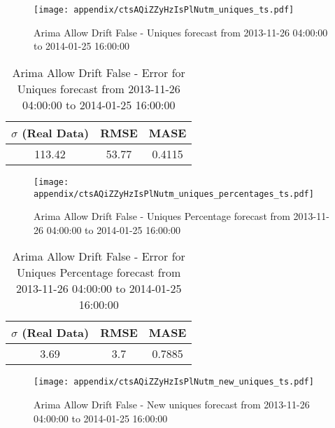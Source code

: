 \begin{figure}[H] \begin{center} \leavevmode
\texttt{[image: appendix/ctsAQiZZyHzIsPlNutm\_uniques\_ts.pdf]} \caption[]{
Arima Allow Drift False - Uniques forecast from 2013-11-26 04:00:00 to 2014-01-25 16:00:00} \label{fig:appendix/ctsAQiZZyHzIsPlNutm_uniques_ts.pdf} \end{center}
\end{figure}

\begin{table}[H]
\centering
\footnotesize
\begin{tabular}{ccc}
$\sigma$ (Real Data) & RMSE & MASE   \\ \hline
113.42 & 53.77 & 0.4115 \\
\end{tabular}

\vspace{0.5cm}

\caption[]{
Arima Allow Drift False - Error for Uniques forecast from 2013-11-26 04:00:00 to 2014-01-25 16:00:00}
\end{table}

\begin{figure}[H] \begin{center} \leavevmode
\texttt{[image: appendix/ctsAQiZZyHzIsPlNutm\_uniques\_percentages\_ts.pdf]} \caption[]{
Arima Allow Drift False - Uniques Percentage forecast from 2013-11-26 04:00:00 to 2014-01-25 16:00:00} \label{fig:appendix/ctsAQiZZyHzIsPlNutm_uniques_percentages_ts.pdf} \end{center}
\end{figure}

\begin{table}[H]
\centering
\footnotesize
\begin{tabular}{ccc}
$\sigma$ (Real Data) & RMSE & MASE   \\ \hline
3.69 & 3.7 & 0.7885 \\
\end{tabular}

\vspace{0.5cm}

\caption[]{
Arima Allow Drift False - Error for Uniques Percentage forecast from 2013-11-26 04:00:00 to 2014-01-25 16:00:00}
\end{table}

\begin{figure}[H] \begin{center} \leavevmode
\texttt{[image: appendix/ctsAQiZZyHzIsPlNutm\_new\_uniques\_ts.pdf]} \caption[]{
Arima Allow Drift False - New uniques forecast from 2013-11-26 04:00:00 to 2014-01-25 16:00:00} \label{fig:appendix/ctsAQiZZyHzIsPlNutm_new_uniques_ts.pdf} \end{center}
\end{figure}

